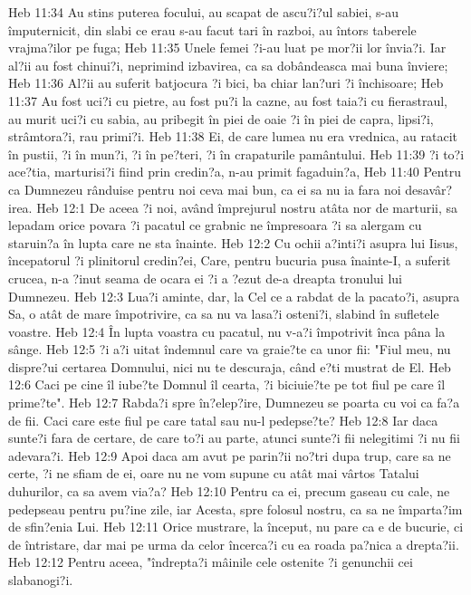 Heb 11:34  Au stins puterea focului, au scapat de ascu?i?ul sabiei, s-au împuternicit, din slabi ce erau s-au facut tari în razboi, au întors taberele vrajma?ilor pe fuga;
Heb 11:35  Unele femei ?i-au luat pe mor?ii lor învia?i. Iar al?ii au fost chinui?i, neprimind izbavirea, ca sa dobândeasca mai buna înviere;
Heb 11:36  Al?ii au suferit batjocura ?i bici, ba chiar lan?uri ?i închisoare;
Heb 11:37  Au fost uci?i cu pietre, au fost pu?i la cazne, au fost taia?i cu fierastraul, au murit uci?i cu sabia, au pribegit în piei de oaie ?i în piei de capra, lipsi?i, strâmtora?i, rau primi?i.
Heb 11:38  Ei, de care lumea nu era vrednica, au ratacit în pustii, ?i în mun?i, ?i în pe?teri, ?i în crapaturile pamântului.
Heb 11:39  ?i to?i ace?tia, marturisi?i fiind prin credin?a, n-au primit fagaduin?a,
Heb 11:40  Pentru ca Dumnezeu rânduise pentru noi ceva mai bun, ca ei sa nu ia fara noi desavâr?irea.
Heb 12:1  De aceea ?i noi, având împrejurul nostru atâta nor de marturii, sa lepadam orice povara ?i pacatul ce grabnic ne împresoara ?i sa alergam cu staruin?a în lupta care ne sta înainte.
Heb 12:2  Cu ochii a?inti?i asupra lui Iisus, începatorul ?i plinitorul credin?ei, Care, pentru bucuria pusa înainte-I, a suferit crucea, n-a ?inut seama de ocara ei ?i a ?ezut de-a dreapta tronului lui Dumnezeu.
Heb 12:3  Lua?i aminte, dar, la Cel ce a rabdat de la pacato?i, asupra Sa, o atât de mare împotrivire, ca sa nu va lasa?i osteni?i, slabind în sufletele voastre.
Heb 12:4  În lupta voastra cu pacatul, nu v-a?i împotrivit înca pâna la sânge.
Heb 12:5  ?i a?i uitat îndemnul care va graie?te ca unor fii: "Fiul meu, nu dispre?ui certarea Domnului, nici nu te descuraja, când e?ti mustrat de El.
Heb 12:6  Caci pe cine îl iube?te Domnul îl cearta, ?i biciuie?te pe tot fiul pe care îl prime?te".
Heb 12:7  Rabda?i spre în?elep?ire, Dumnezeu se poarta cu voi ca fa?a de fii. Caci care este fiul pe care tatal sau nu-l pedepse?te?
Heb 12:8  Iar daca sunte?i fara de certare, de care to?i au parte, atunci sunte?i fii nelegitimi ?i nu fii adevara?i.
Heb 12:9  Apoi daca am avut pe parin?ii no?tri dupa trup, care sa ne certe, ?i ne sfiam de ei, oare nu ne vom supune cu atât mai vârtos Tatalui duhurilor, ca sa avem via?a?
Heb 12:10  Pentru ca ei, precum gaseau cu cale, ne pedepseau pentru pu?ine zile, iar Acesta, spre folosul nostru, ca sa ne împarta?im de sfin?enia Lui.
Heb 12:11  Orice mustrare, la început, nu pare ca e de bucurie, ci de întristare, dar mai pe urma da celor încerca?i cu ea roada pa?nica a drepta?ii.
Heb 12:12  Pentru aceea, "îndrepta?i mâinile cele ostenite ?i genunchii cei slabanogi?i.
